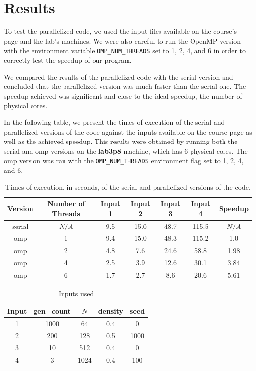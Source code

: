 \documentclass{article}
\begin{document}
\section{Results}

To test the parallelized code, we used the input files available on the course's page 
and the lab's machines. We were also careful to run the OpenMP version with the 
environment variable \texttt{OMP\_NUM\_THREADS} set to 1, 2, 4, and 6 in order to correctly 
test the speedup of our program. 

We compared the results of the parallelized code with the serial version and 
concluded that the parallelized version was much faster than the serial one. 
The speedup achieved was significant and close to the ideal speedup, the number of 
physical cores.

In the following table, we present the times of execution of the serial and parallelized 
versions of the code against the inputs available on the course page as well as the achieved 
speedup. This results were obtained by running both the serial and omp versions on the 
\textbf{lab3p8} machine, which has 6 physical cores. The omp version was ran with the 
\texttt{OMP\_NUM\_THREADS} environment flag set to 1, 2, 4, and 6.

\begin{table}[h!]
	\centering
	\begin{tabular}{||c c c c c c c||} 
	 \hline
	 Version & Number of Threads & Input 1 & Input 2 & Input 3 & Input 4 & Speedup\\ [0.5ex] 
	 \hline\hline
	 serial & $N/A$ & 9.5 & 15.0 & 48.7 & 115.5 & $N/A$ \\ 
	 omp & 1 & 9.4 & 15.0 & 48.3 & 115.2 & 1.0 \\ 
	 omp & 2 & 4.8 & 7.6 & 24.6 & 58.8 & 1.98 \\
	 omp & 4 & 2.5 & 3.9 & 12.6 & 30.1 & 3.84 \\
	 omp & 6 & 1.7 & 2.7 & 8.6 & 20.6 & 5.61 \\ [1ex] 
	 \hline
	\end{tabular}
	\caption{Times of execution, in seconds, of the serial and parallelized versions of the code.}
	\label{table:1}
\end{table}

\begin{table}[h!]
	\centering
	\begin{tabular}{||c c c c c||} 
	 \hline
	 Input & gen\_count & $N$ & density & seed  \\ [0.5ex] 
	 \hline\hline
	 1 & 1000 & 64 & 0.4 & 0 \\ 
	 2 & 200 & 128 & 0.5 & 1000 \\
	 3 & 10 & 512 & 0.4 & 0 \\ 
	 4 & 3 & 1024 & 0.4 & 100 \\ [1ex] 
	 \hline
	\end{tabular}
	\caption{Inputs used}
	\label{table:2}
\end{table}
\end{document}
